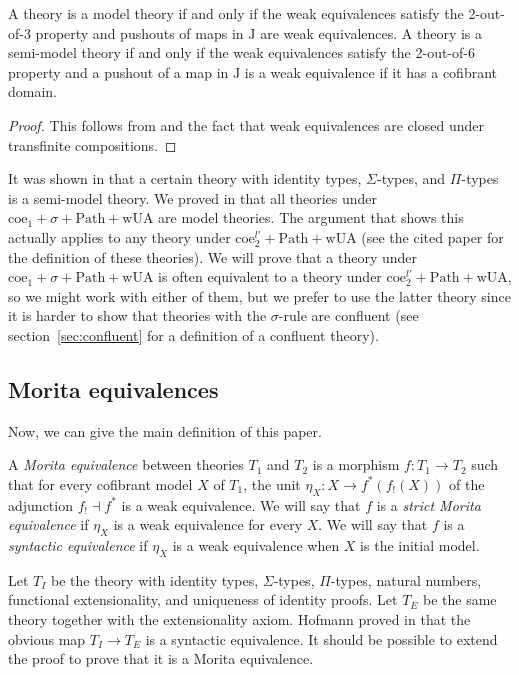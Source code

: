 \documentclass[reqno]{amsart}
\theoremstyle{definition}
\theoremstyle{remark}
\newcommand{\wUA}{\mathrm{wUA}}
\newcommand{\coeT}{\mathrm{coe}}
\newcommand{\PathT}{\mathrm{Path}}
\newcommand{\J}{\mathrm{J}}
\numberwithin{figure}{section}
\begin{document}
\begin{prop}
A theory is a model theory if and only if the weak equivalences satisfy the 2-out-of-3 property and pushouts of maps in $\J$ are weak equivalences.
A theory is a semi-model theory if and only if the weak equivalences satisfy the 2-out-of-6 property and a pushout of a map in $\J$ is a weak equivalence if it has a cofibrant domain.
\end{prop}
\begin{proof}
This follows from \cite[Proposition~3.1]{f-model-structures} and the fact that weak equivalences are closed under transfinite compositions.
\end{proof}

It was shown in \cite{kap-lum-model} that a certain theory with identity types, $\Sigma$-types, and $\Pi$-types is a semi-model theory.
We proved in \cite{alg-models} that all theories under $\coeT_1 + \sigma + \PathT + \wUA$ are model theories.
The argument that shows this actually applies to any theory under $\coeT^{l'}_2 + \PathT + \wUA$ (see the cited paper for the definition of these theories).
We will prove that a theory under $\coeT_1 + \sigma + \PathT + \wUA$ is often equivalent to a theory under $\coeT^{l'}_2 + \PathT + \wUA$, so we might work with either of them,
but we prefer to use the latter theory since it is harder to show that theories with the $\sigma$-rule are confluent (see section~\ref{sec:confluent} for a definition of a confluent theory).

\subsection{Morita equivalences}

Now, we can give the main definition of this paper.

\begin{defn}
A \emph{Morita equivalence} between theories $T_1$ and $T_2$ is a morphism $f : T_1 \to T_2$ such that for every cofibrant model $X$ of $T_1$,
the unit $\eta_X : X \to f^*(f_!(X))$ of the adjunction $f_! \dashv f^*$ is a weak equivalence.
We will say that $f$ is a \emph{strict Morita equivalence} if $\eta_X$ is a weak equivalence for every $X$.
We will say that $f$ is a \emph{syntactic equivalence} if $\eta_X$ is a weak equivalence when $X$ is the initial model.
\end{defn}

\begin{example}
Let $T_I$ be the theory with identity types, $\Sigma$-types, $\Pi$-types, natural numbers, functional extensionality, and uniqueness of identity proofs.
Let $T_E$ be the same theory together with the extensionality axiom.
Hofmann proved in \cite[Theorem~3.2.5]{hofmann-ext} that the obvious map $T_I \to T_E$ is a syntactic equivalence.
It should be possible to extend the proof to prove that it is a Morita equivalence.
\end{example}
\end{document}
